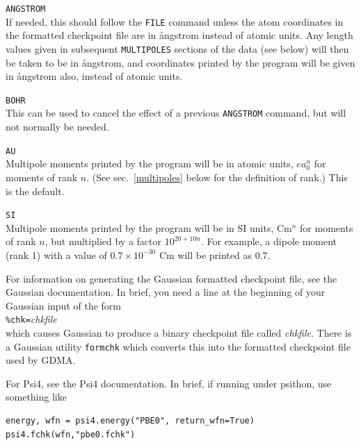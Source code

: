 \documentclass[12pt,txfonts]{paper}
\begin{document}
\hspace*{2 em}\verb/ANGSTROM/\\
If needed, this should follow the \verb+FILE+ command unless the atom
coordinates in 
the formatted checkpoint file are in {\aa}ngstrom instead of atomic units.
Any length values given in subsequent \verb+MULTIPOLES+ sections of the data
(see below) will then be taken to be in {\aa}ngstrom, and coordinates printed
by the program will be given in {\aa}ngstrom also, instead of atomic units.

\hspace*{2 em}\verb/BOHR/\\
This can be used to cancel the effect of a previous \verb/ANGSTROM/
command, but will not normally be needed.

\hspace*{2 em}\verb/AU/\\
Multipole moments printed by the program will be in atomic units,
$ea_0^n$ for moments of rank $n$. (See sec.~\ref{multipoles} below for
the definition of rank.) This is the default.

\hspace*{2 em}\verb/SI/\\
\label{SI}%
Multipole moments printed by the program will be in SI units, Cm$^n$
for moments of rank $n$, but multiplied by a factor $10^{20+10n}$. For
example, a dipole moment (rank 1) with a value of $0.7\times10^{-30}$
Cm will be printed as $0.7$.

For information on generating the Gaussian formatted checkpoint file,
see the Gaussian documentation. In brief, you need a line at the
beginning of your Gaussian input of the form\\
\hspace*{2 em}\verb:%chk=:\emph{chkfile}\\
which causes Gaussian to produce a binary checkpoint file called
\emph{chkfile}. There is a Gaussian utility \verb+formchk+ which
converts this into the formatted checkpoint file used by GDMA.

For Psi4, see the Psi4 documentation. In brief, if running under
psithon, use something like\\[6pt]
\hspace{1em}\begin{minipage}[c]{100mm}
\begin{verbatim}
energy, wfn = psi4.energy("PBE0", return_wfn=True)
psi4.fchk(wfn,"pbe0.fchk")
\end{verbatim}
  \end{minipage}
\end{document}
